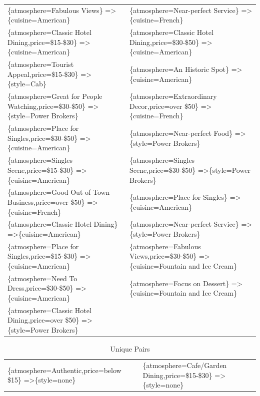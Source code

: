 \documentclass[letterpaper,10pt]{article}
\begin{document}
\begin{appendices}
\begin{table}[h]
\begin{adjustbox}{max width=\textwidth}
\begin{tabular}{ll}
\{atmosphere=Fabulous Views\} =\textgreater \{cuisine=American\} & \{atmosphere=Near-perfect Service\} =\textgreater \{cuisine=French\} \\ 
\{atmosphere=Classic Hotel Dining,price=\$15-\$30\} =\textgreater \{cuisine=American\} & \{atmosphere=Classic Hotel Dining,price=\$30-\$50\} =\textgreater \{cuisine=American\} \\ 
\{atmosphere=Tourist Appeal,price=\$15-\$30\} =\textgreater \{style=Cab\} & \{atmosphere=An Historic Spot\} =\textgreater \{cuisine=American\} \\ 
\{atmosphere=Great for People Watching,price=\$30-\$50\} =\textgreater \{style=Power Brokers\} & \{atmosphere=Extraordinary Decor,price=over \$50\} =\textgreater \{cuisine=French\} \\ 
\{atmosphere=Place for Singles,price=\$30-\$50\} =\textgreater \{cuisine=American\} & \{atmosphere=Near-perfect Food\} =\textgreater \{style=Power Brokers\} \\ 
\{atmosphere=Singles Scene,price=\$15-\$30\} =\textgreater \{cuisine=American\} & \{atmosphere=Singles Scene,price=\$30-\$50\} =\textgreater \{style=Power Brokers\} \\ 
\{atmosphere=Good Out of Town Business,price=over \$50\} =\textgreater \{cuisine=French\} & \{atmosphere=Place for Singles\} =\textgreater \{cuisine=American\} \\ 
\{atmosphere=Classic Hotel Dining\} =\textgreater \{cuisine=American\} & \{atmosphere=Near-perfect Service\} =\textgreater \{style=Power Brokers\} \\ 
\{atmosphere=Place for Singles,price=\$15-\$30\} =\textgreater \{cuisine=American\} & \{atmosphere=Fabulous Views,price=\$30-\$50\} =\textgreater \{cuisine=Fountain and Ice Cream\} \\ 
\{atmosphere=Need To Dress,price=\$30-\$50\} =\textgreater \{cuisine=American\} & \{atmosphere=Focus on Dessert\} =\textgreater \{cuisine=Fountain and Ice Cream\} \\ 
\{atmosphere=Classic Hotel Dining,price=over \$50\} =\textgreater \{style=Power Brokers\} &  \\ 
\end{tabular}
\end{adjustbox}
\end{table}
\begin{table}[h]
\caption*{Unique Pairs}
\begin{adjustbox}{max width=\textwidth}
\begin{tabular}{ll}
\{atmosphere=Authentic,price=below \$15\} =\textgreater \{style=none\} & \{atmosphere=Cafe/Garden Dining,price=\$15-\$30\} =\textgreater \{style=none\} \\ 

\end{tabular}
\end{adjustbox}
\end{table}
\end{appendices}
\end{document}
